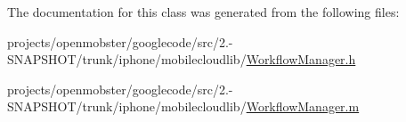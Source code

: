 \label{interface_workflow_manager_a7af94e5ecb6735c84e30b68d256b4559}


\-The documentation for this class was generated from the following files\-:\begin{DoxyCompactItemize}
\item 
projects/openmobster/googlecode/src/2.-\/\-S\-N\-A\-P\-S\-H\-O\-T/trunk/iphone/mobilecloudlib/\hyperlink{_workflow_manager_8h}{\-Workflow\-Manager.\-h}\item 
projects/openmobster/googlecode/src/2.-\/\-S\-N\-A\-P\-S\-H\-O\-T/trunk/iphone/mobilecloudlib/\hyperlink{_workflow_manager_8m}{\-Workflow\-Manager.\-m}\end{DoxyCompactItemize}
